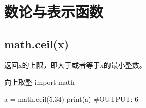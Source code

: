 \documentclass[11pt]{article}
\begin{document}
\section{数论与表示函数}
\subsection{math.ceil(x)}
返回x的上限，即大于或者等于x的最小整数。
\begin{Python}{向上取整}
import math

a = math.ceil(5.34)
print(a)
#OUTPUT:    6
\end{Python}
\end{document}
